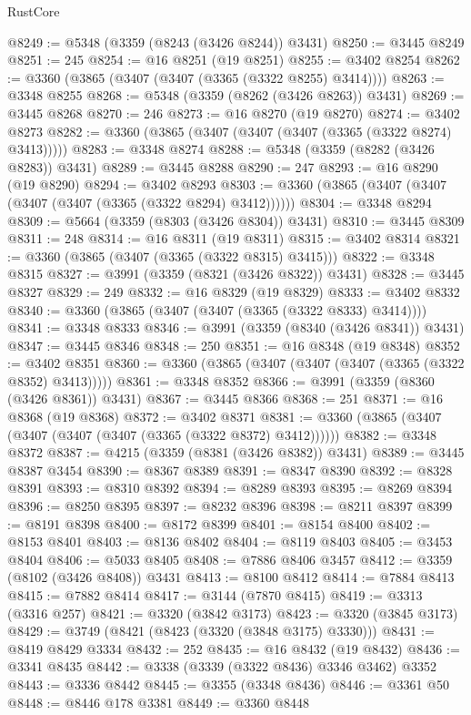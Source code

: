 \begin{lexlean}{RustCore}
\begin{coremodule}
@8249 := @5348 (@3359 (@8243 (@3426 @8244)) @3431)
@8250 := @3445 @8249
@8251 := 245
@8254 := @16 @8251 (@19 @8251)
@8255 := @3402 @8254
@8262 := @3360 (@3865 (@3407 (@3407 (@3365 (@3322 @8255) @3414))))
@8263 := @3348 @8255
@8268 := @5348 (@3359 (@8262 (@3426 @8263)) @3431)
@8269 := @3445 @8268
@8270 := 246
@8273 := @16 @8270 (@19 @8270)
@8274 := @3402 @8273
@8282 := @3360 (@3865 (@3407 (@3407 (@3407 (@3365 (@3322 @8274) @3413)))))
@8283 := @3348 @8274
@8288 := @5348 (@3359 (@8282 (@3426 @8283)) @3431)
@8289 := @3445 @8288
@8290 := 247
@8293 := @16 @8290 (@19 @8290)
@8294 := @3402 @8293
@8303 := @3360 (@3865 (@3407 (@3407 (@3407 (@3407 (@3365 (@3322 @8294) @3412))))))
@8304 := @3348 @8294
@8309 := @5664 (@3359 (@8303 (@3426 @8304)) @3431)
@8310 := @3445 @8309
@8311 := 248
@8314 := @16 @8311 (@19 @8311)
@8315 := @3402 @8314
@8321 := @3360 (@3865 (@3407 (@3365 (@3322 @8315) @3415)))
@8322 := @3348 @8315
@8327 := @3991 (@3359 (@8321 (@3426 @8322)) @3431)
@8328 := @3445 @8327
@8329 := 249
@8332 := @16 @8329 (@19 @8329)
@8333 := @3402 @8332
@8340 := @3360 (@3865 (@3407 (@3407 (@3365 (@3322 @8333) @3414))))
@8341 := @3348 @8333
@8346 := @3991 (@3359 (@8340 (@3426 @8341)) @3431)
@8347 := @3445 @8346
@8348 := 250
@8351 := @16 @8348 (@19 @8348)
@8352 := @3402 @8351
@8360 := @3360 (@3865 (@3407 (@3407 (@3407 (@3365 (@3322 @8352) @3413)))))
@8361 := @3348 @8352
@8366 := @3991 (@3359 (@8360 (@3426 @8361)) @3431)
@8367 := @3445 @8366
@8368 := 251
@8371 := @16 @8368 (@19 @8368)
@8372 := @3402 @8371
@8381 := @3360 (@3865 (@3407 (@3407 (@3407 (@3407 (@3365 (@3322 @8372) @3412))))))
@8382 := @3348 @8372
@8387 := @4215 (@3359 (@8381 (@3426 @8382)) @3431)
@8389 := @3445 @8387 @3454
@8390 := @8367 @8389
@8391 := @8347 @8390
@8392 := @8328 @8391
@8393 := @8310 @8392
@8394 := @8289 @8393
@8395 := @8269 @8394
@8396 := @8250 @8395
@8397 := @8232 @8396
@8398 := @8211 @8397
@8399 := @8191 @8398
@8400 := @8172 @8399
@8401 := @8154 @8400
@8402 := @8153 @8401
@8403 := @8136 @8402
@8404 := @8119 @8403
@8405 := @3453 @8404
@8406 := @5033 @8405
@8408 := @7886 @8406 @3457
@8412 := @3359 (@8102 (@3426 @8408)) @3431
@8413 := @8100 @8412
@8414 := @7884 @8413
@8415 := @7882 @8414
@8417 := @3144 (@7870 @8415)
@8419 := @3313 (@3316 @257)
@8421 := @3320 (@3842 @3173)
@8423 := @3320 (@3845 @3173)
@8429 := @3749 (@8421 (@8423 (@3320 (@3848 @3175) @3330)))
@8431 := @8419 @8429 @3334
@8432 := 252
@8435 := @16 @8432 (@19 @8432)
@8436 := @3341 @8435
@8442 := @3338 (@3339 (@3322 @8436) @3346 @3462) @3352
@8443 := @3336 @8442
@8445 := @3355 (@3348 @8436)
@8446 := @3361 @50
@8448 := @8446 @178 @3381
@8449 := @3360 @8448

\end{coremodule}
\end{lexlean}
